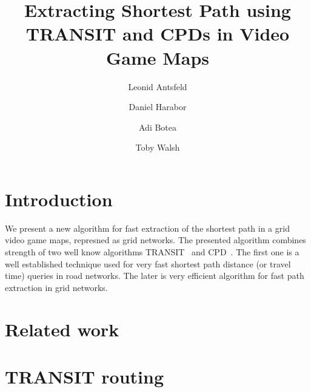\documentclass[runningheads,a4paper]{llncs}
\begin{document}
\mainmatter  %

\title{Extracting Shortest Path using TRANSIT and CPDs in Video Game Maps}


%
%
\author{Leonid Antsfeld \and Daniel Harabor \and Adi  Botea  \and Toby Walsh}



\maketitle

\section{Introduction}
We present a new algorithm for fast extraction of the shortest path in a grid video game maps, represned as grid networks.
The presented algorithm combines strength of two well know algorithms TRANSIT~\cite{bast06} and CPD~\cite{sanka05}.
The first one is a well established technique used for very fast shortest path distance (or travel time) queries in road networks.
The later is very efficient algorithm for fast path extraction in grid networks.

\section{Related work}

\section{TRANSIT routing}\label{sec:transit}
\end{document}
